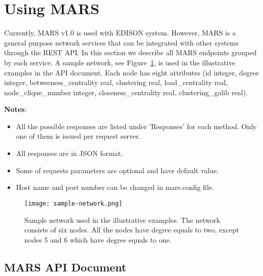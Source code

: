 \section{Using MARS}
Currently, MARS v1.0 is used with EDISON system. However, MARS is a general purpose network services that can be integrated with other systems through the REST API. In this section we describe all MARS endpoints grouped by each service. 
A sample network, see Figure~\ref{fig:sample-network}, is used in the illustrative examples in the API document. Each node has eight attributes (id integer, degree integer, betweeness\_centrality real, clustering real, load\_centrality real, node\_clique\_number integer, closeness\_centrality real, clustering\_galib real).


\noindent \textbf{Notes}:
\begin{itemize}
\item All the possible responses are listed under 'Responses' for each method. Only one of them is issued per request server.
\item All responses are in JSON format.
\item Some of requests parameters are optional and have default value.
\item Host name and port number can be changed in mars.config file. 
\end{itemize}



\begin{figure}[H]
\centering
\texttt{[image: sample-network.png]}
\caption{
Sample network used in the illustrative examples. The network consists of six nodes. All the nodes have degree equals to two, except nodes 5 and 6 which have degree equals to one.
}     

 
\label{fig:sample-network}
\end{figure}
\subsection{MARS API Document}

